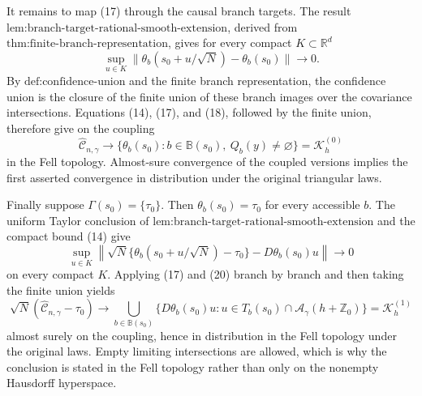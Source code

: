It remains to map (17) through the causal branch targets.  The result \(\text{lem:branch-target-rational-smooth-extension}\), derived from \(\text{thm:finite-branch-representation}\), gives for every compact \(K\subset\mathbb R^d\)
\[
 \sup_{u\in K}
 \|\theta_b(s_0+u/\sqrt N)-\theta_b(s_0)\|
 \longrightarrow0.
 \tag{18}
\]
By \(\text{def:confidence-union}\) and the finite branch representation, the confidence union is the closure of the finite union of these branch images over the covariance intersections.  Equations (14), (17), and (18), followed by the finite union, therefore give on the coupling
\[
 \widehat{\mathcal C}_{n,\gamma}\longrightarrow
 \{\theta_b(s_0):b\in\mathbb B(s_0),\ Q_b(y)\ne\varnothing\}
 =\mathcal K_h^{(0)}
 \tag{19}
\]
in the Fell topology.  Almost-sure convergence of the coupled versions implies the first asserted convergence in distribution under the original triangular laws.

Finally suppose \(\Gamma(s_0)=\{\tau_0\}\).  Then \(\theta_b(s_0)=\tau_0\) for every accessible \(b\).  The uniform Taylor conclusion of \(\text{lem:branch-target-rational-smooth-extension}\) and the compact bound (14) give
\[
 \sup_{u\in K}
 \left\|
 \sqrt N\{\theta_b(s_0+u/\sqrt N)-\tau_0\}
 -D\theta_b(s_0)u
 \right\|\longrightarrow0
 \tag{20}
\]
on every compact \(K\).  Applying (17) and (20) branch by branch and then taking the finite union yields
\[
 \sqrt N(\widehat{\mathcal C}_{n,\gamma}-\tau_0)
 \longrightarrow
 \bigcup_{b\in\mathbb B(s_0)}
 \{D\theta_b(s_0)u:u\in T_b(s_0)\cap
 \mathcal A_\gamma(h+\mathbb Z_0)\}
 =\mathcal K_h^{(1)}
 \tag{21}
\]
almost surely on the coupling, hence in distribution in the Fell topology under the original laws.  Empty limiting intersections are allowed, which is why the conclusion is stated in the Fell topology rather than only on the nonempty Hausdorff hyperspace.